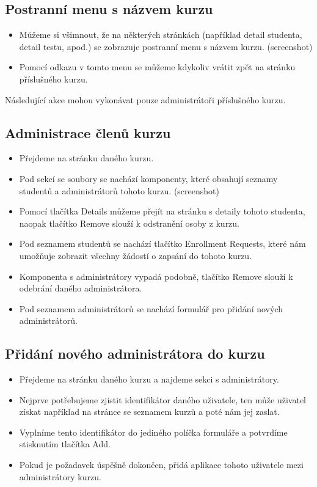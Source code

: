 \subsection{Postranní menu s názvem kurzu}
 \begin{itemize}
 	\item Můžeme si všimnout, že na některých stránkách (například detail studenta, detail testu, apod.) se zobrazuje postranní menu s názvem kurzu. (screenshot)
 	\item Pomocí odkazu v tomto menu se můžeme kdykoliv vrátit zpět na stránku příslušného kurzu.
 \end{itemize}


Následující akce mohou vykonávat pouze administrátoři příslušného kurzu.

\subsection{Administrace členů kurzu}

 \begin{itemize}
	\item Přejdeme na stránku daného kurzu.
	\item Pod sekcí se soubory se nachází komponenty, které obsahují seznamy studentů a administrátorů tohoto kurzu. (screenshot)
	\item Pomocí tlačítka Details můžeme přejít na stránku s detaily tohoto studenta, naopak tlačítko Remove slouží k odstranění osoby z kurzu.
	\item Pod seznamem studentů se nachází tlačítko Enrollment Requests, které nám umožňuje zobrazit všechny žádostí o zapsání do tohoto kurzu.
	\item Komponenta s administrátory vypadá podobně, tlačítko Remove slouží k odebrání daného administrátora.
	\item Pod seznamem administrátorů se nachází formulář pro přidání nových administrátorů.
\end{itemize}

\subsection{Přidání nového administrátora do kurzu}

\begin{itemize}
	\item Přejdeme na stránku daného kurzu a najdeme sekci s administrátory.
	\item Nejprve potřebujeme zjistit identifikátor daného uživatele, ten může uživatel získat například na stránce se seznamem kurzů a poté nám jej zaslat.
	\item Vyplníme tento identifikátor do jediného políčka formuláře a potvrdíme stisknutím tlačítka Add.
	\item Pokud je požadavek úspěšně dokončen, přidá aplikace tohoto uživatele mezi administrátory kurzu.
\end{itemize}

